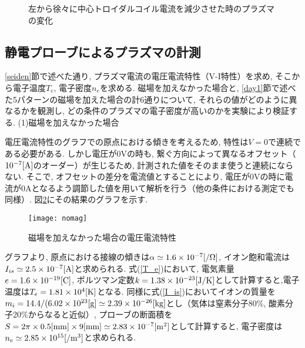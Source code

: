 \documentclass[]{jsarticle}
\begin{document}
	\begin{figure}[htbp]
		\caption{左から徐々に中心トロイダルコイル電流を減少させた時のプラズマの変化}
		\label{variation}
	\end{figure}

	\subsection{静電プローブによるプラズマの計測\label{seiden_results}}
	\ref{seiden}節で述べた通り, プラズマ電流の電圧電流特性（V-I特性）を求め, そこから電子温度$T_e$, 電子密度$n_e$を求める. 磁場を加えなかった場合と, \ref{day1}節で述べた5パターンの磁場を加えた場合の計6通りについて, それらの値がどのように異なるかを観測し, どの条件のプラズマの電子密度が高いのかを実験により検証する.
	(1)磁場を加えなかった場合
	
		電圧電流特性のグラフでの原点における傾きを考えるため, 特性は$V = 0$で連続である必要がある. しかし電圧が0Vの時も, 繋ぐ方向によって異なるオフセット（$10^{-7}[\rm{A}]$のオーダー）が生じるため,  計測された値をそのまま使うと連続にならない. そこで, オフセットの差分を電流値とすることにより, 電圧が0Vの時に電流が0Aとなるよう調節した値を用いて解析を行う（他の条件における測定でも同様）. 図\ref{nomag}にその結果のグラフを示す. 	
	\begin{figure}[htbp]
	\begin{center}
	\texttt{[image: nomag]}
	\caption{磁場を加えなかった場合の電圧電流特性}
	\label{nomag}
	\end{center}
	\end{figure}
	
	グラフより, 原点における接線の傾きは$\alpha \simeq 1.6\times10^{-7}[/\rm{\Omega}]$, イオン飽和電流は$I_{is} \simeq 2.5\times10^{-7}[\rm{A}]$と求められる. 式(\ref{T_e})において, 電気素量$e = 1.6 \times 10^{-19}[\rm{C}]$, ボルツマン定数$k = 1.38 \times 10^{-23}[\rm{J/K}]$として計算すると,電子温度は$T_e = 1.81 \times 10^4[\rm{K}]$となる. 同様に式(\ref{I_is})においてイオンの質量を$m_i = 14.4 / (6.02 \times 10^{23} [\rm{g}] \simeq 2.39 \times 10^{-26}[\rm{kg}]$とし（気体は窒素分子80\%, 酸素分子20\%からなると近似）, プローブの断面積を$S = 2\pi \times 0.5[\rm{mm}] \times 9[mm] \simeq 2.83 \times 10^{-7} [\rm{m^2}]$として計算すると, 電子密度は$n_e \simeq 2.85 \times 10^{15}[\rm{/m^3}]$と求められる. 
	
\end{document}
